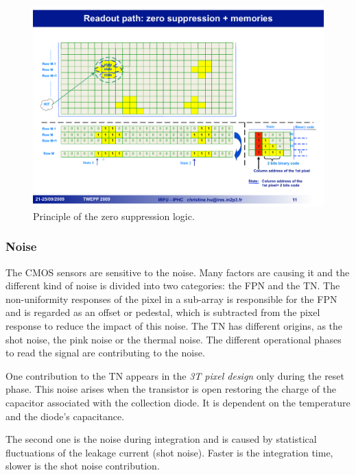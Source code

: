     \begin{figure}[!h]
      \centering
      \includegraphics[width=\textwidth]{Pictures/vxd/suze_hit.pdf}
      \caption{Principle of the zero suppression logic. }
      \label{fig:SUZE}
    \end{figure}

    \subsubsection{Noise}

    The \gls{CMOS} sensors are sensitive to the noise.
    Many factors are causing it and the different kind of noise is divided into two categories: the \gls{FPN} and the \gls{TN}.
    The non-uniformity responses of the pixel in a sub-array is responsible for the \gls{FPN} and is regarded as an offset or pedestal, which is subtracted from the pixel response to reduce the impact of this noise.
    The \gls{TN} has different origins, as the shot noise, the pink noise or the thermal noise.
    The different operational phases to read the signal are contributing to the noise.
    
    One contribution to the \gls{TN} appears in the \textit{3T pixel design} only during the reset phase.
    This noise arises when the transistor is open restoring the charge of the capacitor associated with the collection diode.
    It is dependent on the temperature and the diode's capacitance.
    
    The second one is the noise during integration and is caused by statistical fluctuations of the leakage current (shot noise).
    Faster is the integration time, slower is the shot noise contribution.
    
